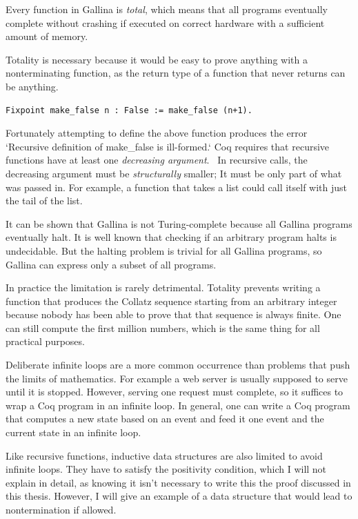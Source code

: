 \documentclass[english, 12pt, a4paper, sci, a-1b, online]{aaltothesis}
\begin{document}
Every function in Gallina is \emph{total}, which means that all programs eventually complete without crashing if executed on correct hardware with a sufficient amount of memory.

Totality is necessary because it would be easy to prove anything with a nonterminating function, as the return type of a function that never returns can be anything.
\begin{verbatim}
Fixpoint make_false n : False := make_false (n+1).
\end{verbatim}
Fortunately attempting to define the above function produces the error `Recursive definition of make\_false is ill-formed.` Coq requires that recursive functions have at least one \emph{decreasing argument}.~\cite{coqRefman} In recursive calls, the decreasing argument must be \emph{structurally} smaller; It must be only part of what was passed in. For example, a function that takes a list could call itself with just the tail of the list.

It can be shown that Gallina is not Turing-complete because all Gallina programs eventually halt. It is well known that checking if an arbitrary program halts is undecidable. But the halting problem is trivial for all Gallina programs, so Gallina can express only a subset of all programs.

In practice the limitation is rarely detrimental. Totality prevents writing a function that produces the Collatz sequence starting from an arbitrary integer because nobody has been able to prove that that sequence is always finite. One can still compute the first million numbers, which is the same thing for all practical purposes.

Deliberate infinite loops are a more common occurrence than problems that push the limits of mathematics. For example a web server is usually supposed to serve until it is stopped. However, serving one request must complete, so it suffices to wrap a Coq program in an infinite loop. In general, one can write a Coq program that computes a new state based on an event and feed it one event and the current state in an infinite loop.

Like recursive functions, inductive data structures are also limited to avoid infinite loops. They have to satisfy the positivity condition, which I will not explain in detail, as knowing it isn't necessary to write this the proof discussed in this thesis. However, I will give an example of a data structure that would lead to nontermination if allowed.
\end{document}

